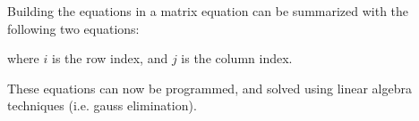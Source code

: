 \documentclass{../../KDHnotes}
\begin{document}
Building the equations in a matrix equation can be summarized with the following two equations:


where $i$ is the row index, and $j$ is the column index.


These equations can now be programmed, and solved using linear algebra techniques (i.e. gauss elimination).


\nocite{NumMethods}
\nocite{holisticnumericalmethods}

\newpage



\end{document}
